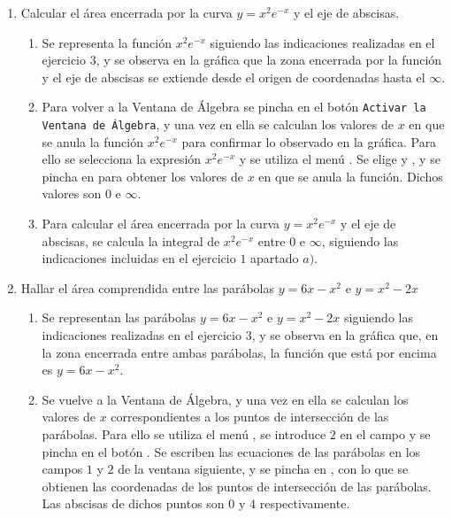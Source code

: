 \begin{enumerate}[leftmargin=*]
\item Calcular el área encerrada por la curva $y=x^{2}e^{-x}$ y el eje de abscisas.
\begin{indication}
{
\begin{enumerate}

\item Se representa la función $x^{2}e^{-x}$ siguiendo las indicaciones realizadas en el ejercicio
$3$, y se observa en la gráfica que la zona encerrada por la función
y el eje de abscisas se extiende desde el origen de coordenadas
hasta el $\infty$.

\item Para volver a la Ventana de Álgebra se pincha en el botón
\texttt{Activar la Ventana de Álgebra}, y una vez en ella se
calculan los valores de $x$ en que se anula la función $x^{2}e^{-x}$
para confirmar lo observado en la gráfica. Para ello se selecciona
la expresión $x^{2}e^{-x}$ y se utiliza el menú
. Se elige  y
, y se pincha en  para obtener
los valores de $x$ en que se anula la función. Dichos valores son
$0$ e $\infty$.

\item Para calcular el área encerrada por la curva $y=x^{2}e^{-x}$ y el eje de abscisas, se
calcula la integral de $x^{2}e^{-x}$ entre $0$ e $\infty$, siguiendo
las indicaciones incluidas en el ejercicio $1$ apartado $a)$.
\end{enumerate}
}
\end{indication}
\item Hallar el área comprendida entre las parábolas $y=6x-x^{2}$ e $y=x^{2}-2x$

\begin{indication}
{
\begin{enumerate}
\item Se representan las parábolas $y=6x-x^2$ e $y=x^{2}-2x$ siguiendo
las indicaciones realizadas en el ejercicio $3$, y se observa en la
gráfica que, en la zona encerrada entre ambas parábolas, la función
que está por encima es $y=6x-x^2$.

\item Se vuelve a la Ventana de Álgebra, y una vez en ella se
calculan los valores de $x$ correspondientes a los puntos de
intersección de las parábolas. Para ello se utiliza el menú
, se introduce $2$ en el campo
 y se pincha en el botón . Se escriben las
ecuaciones de las parábolas en los campos $1$ y $2$ de la ventana
siguiente, y se pincha en , con lo que se obtienen
las coordenadas de los puntos de intersección de las parábolas. Las
abscisas de dichos puntos son $0$ y $4$ respectivamente.


\end{enumerate}}
\end{indication}
\end{enumerate}
